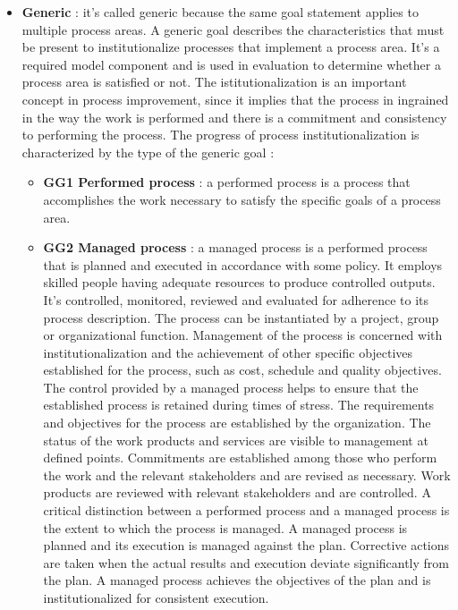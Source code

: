 \documentclass[11pt]{article}
\begin{document}
\begin{itemize}
\item \textbf{Generic} : it's called generic because the same goal statement applies to multiple process areas. A generic goal describes the characteristics that must be present to institutionalize processes that implement a process area. It's a required model component and is used in evaluation to determine whether a process area is satisfied or not. The istitutionalization is an important concept in process improvement, since it implies that the process in ingrained in the way the work is performed and there is a commitment and consistency to performing the process. The progress of process institutionalization is characterized by the type of the generic goal :
\begin{itemize}
\item \textbf{GG1 \- Performed process} : a performed process is a process that accomplishes the work necessary to satisfy the specific goals of a process area.
\item \textbf{GG2 \- Managed process} : a managed process is a performed process that is planned and executed in accordance with some policy. It employs skilled people having adequate resources to produce controlled outputs. It's controlled, monitored, reviewed and evaluated for adherence to its process description. The process can be instantiated by a project, group or organizational function. Management of the process is concerned with institutionalization and the achievement of other specific objectives established for the process, such as cost, schedule and quality objectives. The control provided by a managed process helps to ensure that the established process is retained during times of stress. The requirements and objectives for the process are established by the organization. The status of the work products and services are visible to management at defined points. Commitments are established among those who perform the work and the relevant stakeholders and are revised as necessary. Work products are reviewed with relevant stakeholders and are controlled. A critical distinction between a performed process and a managed process is the extent to which the process is managed. A managed process is planned and its execution is managed against the plan. Corrective actions are taken when the actual results and execution deviate significantly from the plan. A managed process achieves the objectives of the plan and is institutionalized for consistent execution. 

\end{itemize}
\end{itemize}
\end{document}
